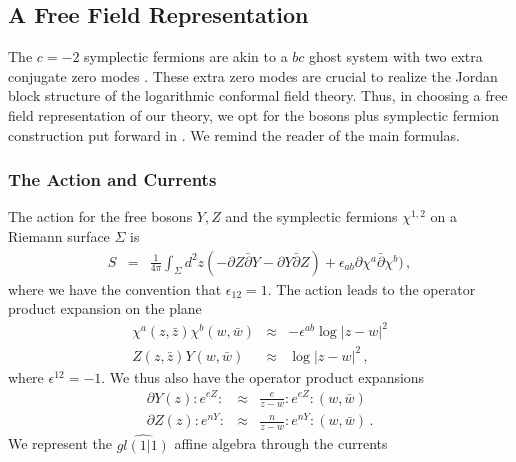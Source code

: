 \documentclass[12pt]{article}
\numberwithin{equation}{section}
\numberwithin{equation}{section}
\numberwithin{table}{section}\setlength{\multlinegap}{25pt}
\begin{document}
\subsection{A Free Field Representation}
The $c=-2$ symplectic fermions are akin to a 
$bc$ ghost system with two extra conjugate zero modes  \cite{Flohr:2003tc}. These extra zero modes are crucial to
realize the Jordan block structure of the logarithmic conformal field theory. Thus, in choosing a free field representation
of our theory, we opt for the bosons plus symplectic fermion construction put forward in \cite{Creutzig:2008an}. We remind the reader
of the main formulas.
\subsubsection{The Action and Currents}
The action for the free bosons $Y,Z$ and the symplectic fermions $\chi^{1,2}$ on a Riemann surface $\Sigma$ is
\begin{eqnarray}
S &=& \frac{1}{4 \pi} \int_{\Sigma} d^2 z ( - \partial Z \bar{\partial} Y -
\partial Y \bar{\partial} Z) + \epsilon_{ab} \partial \chi^a \bar{\partial} \chi^b) \, ,
\end{eqnarray}
where we have the convention that $\epsilon_{12}=1$. The action leads to the operator product expansion on the plane
\begin{eqnarray}
\chi^a(z,\bar{z}) \chi^b(w,\bar{w}) & \approx & - \epsilon^{ab} \log |z-w|^2
\nonumber \\
Z(z,\bar{z}) Y(w,\bar{w}) & \approx & \log |z-w|^2 
\, ,
\end{eqnarray}
where $\epsilon^{12}=-1$. We thus also have the operator product expansions
\begin{eqnarray}
\partial Y(z) :e^{e Z}: & \approx & \frac{e}{z-w} :e^{e Z}:(w,\bar{w})
\nonumber \\
\partial Z (z) :e^{n Y}: & \approx &  \frac{n}{z-w} :e^{n Y}:(w,\bar{w}) \, .
\end{eqnarray}
We represent the $\widehat{gl(1|1)}$ affine algebra through the currents
\end{document}
